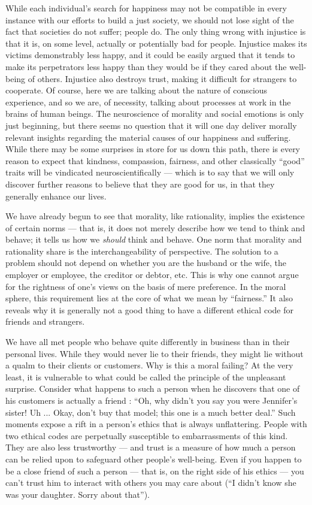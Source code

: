 \documentclass[a4paper,14pt]{extbook}
\begin{document}
While each individual's search for happiness may not be compatible in every instance with our efforts to build a just society, we should not lose sight of the fact that societies do not suffer;
people do.
The only thing wrong with injustice is that it is, on some level, actually or potentially bad for people.
Injustice makes its victims demonstrably less happy, and it could be easily argued that it tends to make its perpetrators less happy than they would be if they cared about the well-being of others.
Injustice also destroys trust, making it difficult for strangers to cooperate.
Of course, here we are talking about the nature of conscious experience, and so we are, of necessity, talking about processes at work in the brains of human beings.
The neuroscience of morality and social emotions is only just beginning, but there seems no question that it will one day deliver morally relevant insights regarding the material causes of our happiness and suffering.
While there may be some surprises in store for us down this path, there is every reason to expect that kindness, compassion, fairness, and other classically ``good'' traits will be vindicated neuroscientifically --- which is to say that we will only discover further reasons to believe that they are good for us, in that they generally enhance our lives.

We have already begun to see that morality, like rationality, implies the existence of certain norms --- that is, it does not merely describe how we tend to think and behave;
it tells us how we \textit{should} think and behave.
One norm that morality and rationality share is the interchangeability of perspective.
The solution to a problem should not depend on whether you are the husband or the wife, the employer or employee, the creditor or debtor, etc.
This is why one cannot argue for the rightness of one's views on the basis of mere preference.
In the moral sphere, this requirement lies at the core of what we mean by ``fairness.''
It also reveals why it is generally not a good thing to have a different ethical code for friends and strangers.

We have all met people who behave quite differently in business than in their personal lives.
While they would never lie to their friends, they might lie without a qualm to their clients or customers.
Why is this a moral failing?
At the very least, it is vulnerable to what could be called the principle of the unpleasant surprise.
Consider what happens to such a person when he discovers that one of his customers is actually a friend :
``Oh, why didn't you say you were Jennifer's sister!
Uh ... Okay, don't buy that model;
this one is a much better deal.''
Such moments expose a rift in a person's ethics that is always unflattering.
People with two ethical codes are perpetually susceptible to embarrassments of this kind.
They are also less trustworthy --- and trust is a measure of how much a person can be relied upon to safeguard other people's well-being.
Even if you happen to be a close friend of such a person --- that is, on the right side of his ethics --- you can't trust him to interact with others you may care about
(``I didn't know she was your daughter.
Sorry about that'').
\end{document}
